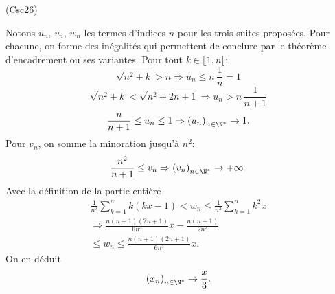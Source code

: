 \begin{tiny}(Csc26)\end{tiny} Notons $u_n$, $v_n$, $w_n$ les termes d'indices $n$ pour les trois suites proposées. 
Pour chacune, on forme des inégalités qui permettent de conclure par le théorème d'encadrement ou ses variantes.\newline
Pour tout $k \in \llbracket 1,n \rrbracket$:
\[
 \sqrt{n^2 + k} > n \Rightarrow u_n \leq n\, \frac{1}{n} = 1
\]
\[
 \sqrt{n^2 + k} < \sqrt{n^2 + 2n +1} \Rightarrow u_n > n\, \frac{1}{n+1}
\]
\[
 \frac{n}{n+1} \leq u_n \leq 1 \Rightarrow \left( u_n \right)_{n \in \N^*} \rightarrow 1.
\]
Pour $v_n$, on somme la minoration jusqu'à $n^2$:
\[
 \frac{n^2}{n+1} \leq v_n \Rightarrow \left( v_n \right)_{n \in \N^*} \rightarrow +\infty.
\]
Avec la définition de la partie entière
\begin{multline*}
 \frac{1}{n^3}\sum_{k=1}^nk(kx-1) < w_n \leq \frac{1}{n^3}\sum_{k=1}^nk^2x \\
 \Rightarrow
 \frac{n(n+1)(2n+1)}{6n^3} x  - \frac{n(n+1)}{2n^3} \\
 \leq w_n \leq \frac{n(n+1)(2n+1)}{6n^3} x.
\end{multline*}
On en déduit 
\[
 \left( x_n \right)_{n \in \N^*} \rightarrow \frac{x}{3}.
\]

